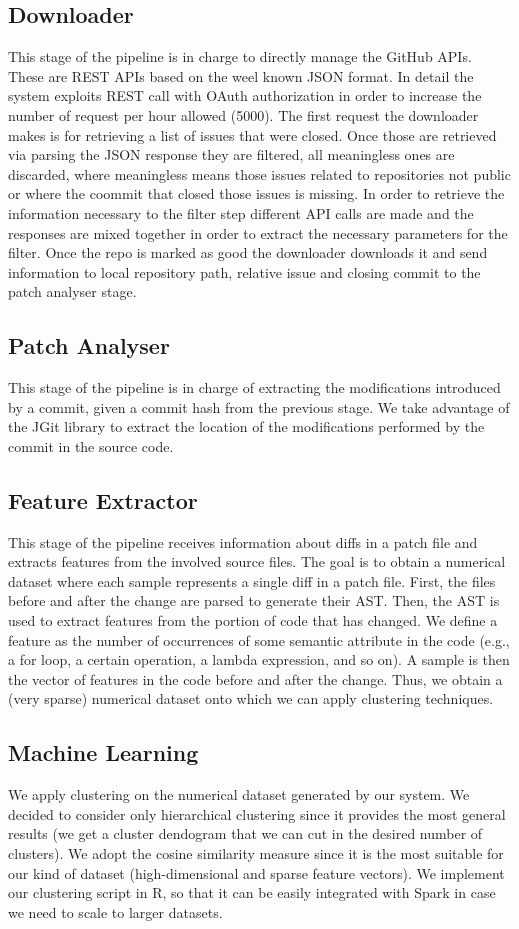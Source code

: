 \subsection{Downloader}
This stage of the pipeline is in charge to directly manage the GitHub APIs. These are REST APIs based on the weel known JSON format. In detail the system exploits REST call with OAuth authorization in order to increase the number of request per hour allowed (5000). The first request the downloader makes is for retrieving a list of issues that were closed. Once those are retrieved via parsing the JSON response they are filtered, all meaningless ones are discarded, where meaningless means those issues related to repositories not public or where the coommit that closed those issues is missing. In order to retrieve the information necessary to the filter step different API calls are made and the responses are mixed together in order to extract the necessary parameters for the filter. Once the repo is marked as good the downloader downloads it and send information to local repository path, relative issue and closing commit to the patch analyser stage. 
\subsection{Patch Analyser}
This stage of the pipeline is in charge of extracting the modifications introduced by a commit, given a commit hash from the previous stage. We take advantage of the JGit library to extract the location of the modifications performed by the commit in the source code.
\subsection{Feature Extractor}
This stage of the pipeline receives information about diffs in a patch file and extracts features from the involved source files. The goal is to obtain a numerical dataset where each sample represents a single diff in a patch file. First, the files before and after the change are parsed to generate their AST. Then, the AST is used to extract features from the portion of code that has changed. We define a feature as the number of occurrences of some semantic attribute in the code (e.g., a for loop, a certain operation, a lambda expression, and so on). A sample is then the vector of features in the code before and after the change. Thus, we obtain a (very sparse) numerical dataset onto which we can apply clustering techniques. 
\subsection{Machine Learning} 
We apply clustering on the numerical dataset generated by our system. We decided to consider only hierarchical clustering since it provides the most general results (we get a cluster dendogram that we can cut in the desired number of clusters). We adopt the cosine similarity measure since it is the most suitable for our kind of dataset (high-dimensional and sparse feature vectors). We implement our clustering script in R, so that it can be easily integrated with Spark in case we need to scale to larger datasets.